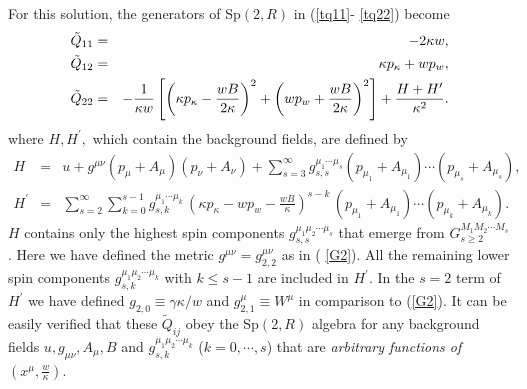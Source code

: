 \documentclass[a4paper,12pt]{article}
\begin{document}
For this solution, the generators of Sp$\left( 2,R\right) $ in (\ref{tq11}-%
\ref{tq22}) become
\begin{eqnarray}
\tilde{Q}_{11} &=&-2\kappa w, \\
\tilde{Q}_{12} &=&\kappa p_{\kappa }+wp_{w}, \\
\tilde{Q}_{22} &=&-\frac{1}{\kappa w}\left[ \left( \kappa p_{\kappa }-\frac{%
wB}{2\kappa }\right) ^{2}+\left( wp_{w}+\frac{wB}{2\kappa }\right) ^{2}%
\right] +\frac{H+H^{\prime }}{\kappa ^{2}}.
\end{eqnarray}
where $H,H^{\prime },$ which contain the background fields, are defined by
\begin{eqnarray}
H &=&u+g^{\mu \nu }(p_{\mu }+A_{\mu })(p_{\nu }+A_{\nu })+\sum_{s=3}^{\infty
}g_{s,s}^{\mu _{1}\cdots \mu _{s}}(p_{\mu _{1}}+A_{\mu _{1}}) \cdots (p_{\mu
_{s}}+A_{\mu _{s}}),  \label{H} \\
H^{\prime } &=&\sum_{s=2}^{\infty }\sum_{k=0}^{s-1} g_{s,k}^{\mu _{1}\cdots
\mu _{k}}\,\left( \kappa p_{\kappa }-wp_{w}-\frac{wB}{\kappa }\right)
^{s-k}\,(p_{\mu _{1}}+A_{\mu _{1}})\cdots (p_{\mu _{k}}+A_{\mu _{k}}).
\end{eqnarray}
$H$ contains only the highest spin components $g_{s,s}^{\mu _{1}\mu
_{2}\cdots \mu _{s}}$ that emerge from $G_{s\geq 2}^{M_{1}M_{2}\cdots M_{s}}$%
. Here we have defined the metric $g^{\mu \nu }=g_{2,2}^{\mu \nu }$ as in (%
\ref{G2}). All the remaining lower spin components $g_{s,k}^{\mu _{1}\mu
_{2}\cdots \mu _{k}}$ with $k\leq s-1$ are included in $H^{\prime }.$ In the
$s=2$ term of $H^{\prime }$ we have defined $g_{2,0}\equiv \gamma \kappa /w$
and $g_{2,1}^{\mu }\equiv W^{\mu }$ in comparison to (\ref{G2})$.$ It can be
easily verified that these $\tilde{Q}_{ij}$ obey the Sp$(2,R)$ algebra for
any background fields $u,g_{\mu \nu },A_{\mu },B$ and $g_{s,k}^{\mu _{1}\mu
_{2}\cdots \mu _{k}}$ ($k=0,\cdots ,s$) that are \textit{arbitrary functions
of} $\left( x^{\mu },\frac{w}{\kappa }\right) $.
\end{document}
